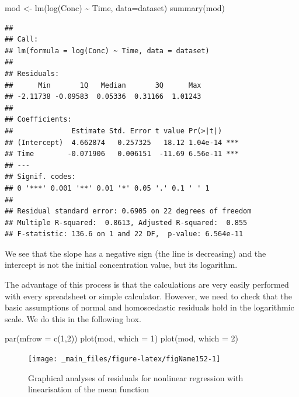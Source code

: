 \documentclass[a4paper,12pt,oneside]{book}
\newenvironment{Shaded}{\begin{snugshade}}{\end{snugshade}}
\newcommand{\DecValTok}[1]{#1}
\newcommand{\SpecialCharTok}[1]{#1}
\newcommand{\OtherTok}[1]{#1}
\newcommand{\FunctionTok}[1]{#1}
\newcommand{\AttributeTok}[1]{#1}
\newcommand{\NormalTok}[1]{#1}
\begin{document}
\begin{Shaded}
\begin{Highlighting}[]
\NormalTok{mod }\OtherTok{\textless{}{-}} \FunctionTok{lm}\NormalTok{(}\FunctionTok{log}\NormalTok{(Conc) }\SpecialCharTok{\textasciitilde{}}\NormalTok{ Time, }\AttributeTok{data=}\NormalTok{dataset)}
\FunctionTok{summary}\NormalTok{(mod)}
\end{Highlighting}
\end{Shaded}

\begin{verbatim}
## 
## Call:
## lm(formula = log(Conc) ~ Time, data = dataset)
## 
## Residuals:
##      Min       1Q   Median       3Q      Max 
## -2.11738 -0.09583  0.05336  0.31166  1.01243 
## 
## Coefficients:
##              Estimate Std. Error t value Pr(>|t|)    
## (Intercept)  4.662874   0.257325   18.12 1.04e-14 ***
## Time        -0.071906   0.006151  -11.69 6.56e-11 ***
## ---
## Signif. codes:  
## 0 '***' 0.001 '**' 0.01 '*' 0.05 '.' 0.1 ' ' 1
## 
## Residual standard error: 0.6905 on 22 degrees of freedom
## Multiple R-squared:  0.8613, Adjusted R-squared:  0.855 
## F-statistic: 136.6 on 1 and 22 DF,  p-value: 6.564e-11
\end{verbatim}

We see that the slope has a negative sign (the line is decreasing) and the intercept is not the initial concentration value, but its logarithm.

The advantage of this process is that the calculations are very easily performed with every spreadsheet or simple calculator. However, we need to check that the basic assumptions of normal and homoscedastic residuals hold in the logarithmic scale. We do this in the following box.

\begin{Shaded}
\begin{Highlighting}[]
\FunctionTok{par}\NormalTok{(}\AttributeTok{mfrow =} \FunctionTok{c}\NormalTok{(}\DecValTok{1}\NormalTok{,}\DecValTok{2}\NormalTok{))}
\FunctionTok{plot}\NormalTok{(mod, }\AttributeTok{which =} \DecValTok{1}\NormalTok{)}
\FunctionTok{plot}\NormalTok{(mod, }\AttributeTok{which =} \DecValTok{2}\NormalTok{)}
\end{Highlighting}
\end{Shaded}

\begin{figure}

{\centering \texttt{[image: \_main\_files/figure-latex/figName152-1]} 

}

\caption{Graphical analyses of residuals for nonlinear regression with linearisation of the mean function}\label{fig:figName152}
\end{figure}
\end{document}
